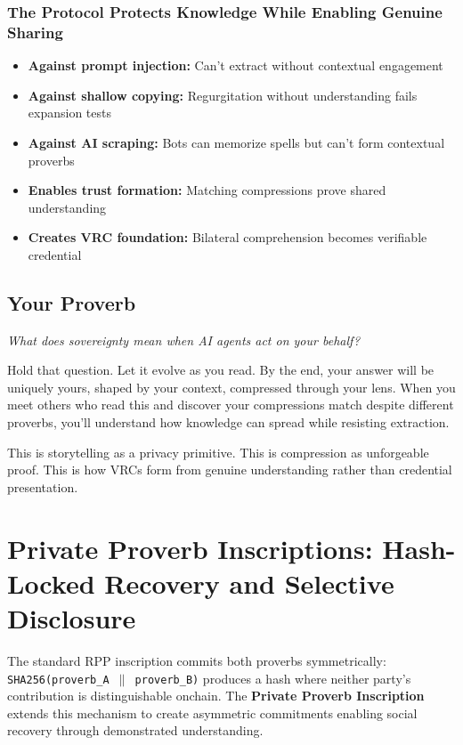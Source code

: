 \documentclass[11pt,a4paper]{article}
\theoremstyle{definition}
\begin{document}
\subsubsection{The Protocol Protects Knowledge While Enabling Genuine Sharing}

\begin{itemize}
    \item \textbf{Against prompt injection:} Can't extract without contextual engagement
    \item \textbf{Against shallow copying:} Regurgitation without understanding fails expansion tests
    \item \textbf{Against AI scraping:} Bots can memorize spells but can't form contextual proverbs
    \item \textbf{Enables trust formation:} Matching compressions prove shared understanding
    \item \textbf{Creates VRC foundation:} Bilateral comprehension becomes verifiable credential
\end{itemize}

\subsection{Your Proverb}

\textit{What does sovereignty mean when AI agents act on your behalf?}

Hold that question. Let it evolve as you read. By the end, your answer will be uniquely yours, shaped by your context, compressed through your lens. When you meet others who read this and discover your compressions match despite different proverbs, you'll understand how knowledge can spread while resisting extraction.

This is storytelling as a privacy primitive. This is compression as unforgeable proof. This is how VRCs form from genuine understanding rather than credential presentation.

\section{Private Proverb Inscriptions: Hash-Locked Recovery and Selective Disclosure}

The standard RPP inscription commits both proverbs symmetrically: \texttt{SHA256(proverb\_A $\parallel$ proverb\_B)} produces a hash where neither party's contribution is distinguishable onchain. The \textbf{Private Proverb Inscription} extends this mechanism to create asymmetric commitments enabling social recovery through demonstrated understanding.
\end{document}

